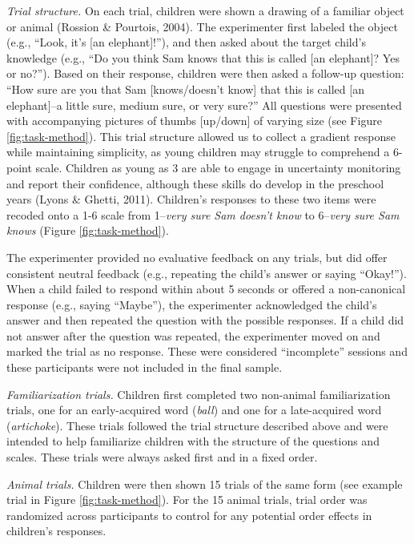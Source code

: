 \documentclass[10pt, letterpaper]{article}
\begin{document}
\emph{Trial structure.} On each trial, children were shown a drawing of
a familiar object or animal (Rossion \& Pourtois, 2004). The
experimenter first labeled the object (e.g., ``Look, it's {[}an
elephant{]}!''), and then asked about the target child's knowledge
(e.g., ``Do you think Sam knows that this is called {[}an elephant{]}?
Yes or no?''). Based on their response, children were then asked a
follow-up question: ``How sure are you that Sam {[}knows/doesn't know{]}
that this is called {[}an elephant{]}--a little sure, medium sure, or
very sure?'' All questions were presented with accompanying pictures of
thumbs {[}up/down{]} of varying size (see Figure \ref{fig:task-method}).
This trial structure allowed us to collect a gradient response while
maintaining simplicity, as young children may struggle to comprehend a
6-point scale. Children as young as 3 are able to engage in uncertainty
monitoring and report their confidence, although these skills do develop
in the preschool years (Lyons \& Ghetti, 2011). Children's responses to
these two items were recoded onto a 1-6 scale from 1--\emph{very sure
Sam doesn't know} to 6--\emph{very sure Sam knows} (Figure
\ref{fig:task-method}).

The experimenter provided no evaluative feedback on any trials, but did
offer consistent neutral feedback (e.g., repeating the child's answer or
saying ``Okay!''). When a child failed to respond within about 5 seconds
or offered a non-canonical response (e.g., saying ``Maybe''), the
experimenter acknowledged the child's answer and then repeated the
question with the possible responses. If a child did not answer after
the question was repeated, the experimenter moved on and marked the
trial as no response. These were considered ``incomplete'' sessions and
these participants were not included in the final sample.

\emph{Familiarization trials.} Children first completed two non-animal
familiarization trials, one for an early-acquired word (\emph{ball}) and
one for a late-acquired word (\emph{artichoke}). These trials followed
the trial structure described above and were intended to help
familiarize children with the structure of the questions and scales.
These trials were always asked first and in a fixed order.

\emph{Animal trials.} Children were then shown 15 trials of the same
form (see example trial in Figure \ref{fig:task-method}). For the 15
animal trials, trial order was randomized across participants to control
for any potential order effects in children's responses.
\end{document}
